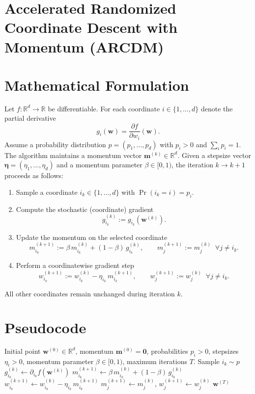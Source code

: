 \documentclass{article}
\newcommand{\R}{\mathbb{R}}
\begin{document}
\section*{Accelerated Randomized Coordinate Descent with Momentum (ARCDM)}

\section*{Mathematical Formulation}
Let $f:\R^{d}\rightarrow\R$ be differentiable.  
For each coordinate $i\in\{1,\dots ,d\}$ denote the partial derivative
\[
g_i(\mathbf w)=\frac{\partial f}{\partial w_i}(\mathbf w).
\]
Assume a probability distribution $p=(p_1,\dots ,p_d)$ with $p_i>0$ and $\sum_i p_i=1$.
The algorithm maintains a momentum vector $\mathbf m^{(k)}\in\R^{d}$.
Given a stepsize vector $\boldsymbol\eta=(\eta_1,\dots ,\eta_d)$ and a momentum
parameter $\beta\in[0,1)$, the iteration $k\!\to\!k+1$ proceeds as follows:

\begin{enumerate}
    \item Sample a coordinate $i_k\in\{1,\dots ,d\}$ with $\Pr(i_k=i)=p_i$.
    \item Compute the stochastic (coordinate) gradient
    \[
        g_{i_k}^{(k)}:=g_{i_k}(\mathbf w^{(k)}).
    \]
    \item Update the momentum on the selected coordinate
    \[
        m_{i_k}^{(k+1)}:=\beta\,m_{i_k}^{(k)}+(1-\beta)\,g_{i_k}^{(k)},
        \qquad
        m_{j}^{(k+1)}:=m_{j}^{(k)}\;\; \forall j\neq i_k .
    \]
    \item Perform a coordinatewise gradient step
    \[
        w_{i_k}^{(k+1)}:=w_{i_k}^{(k)}-\eta_{i_k}\,m_{i_k}^{(k+1)},
        \qquad
        w_{j}^{(k+1)}:=w_{j}^{(k)}\;\; \forall j\neq i_k .
    \]
\end{enumerate}

All other coordinates remain unchanged during iteration $k$.

\section*{Pseudocode}
\begin{algorithm}[H]
\caption{Accelerated Randomized Coordinate Descent with Momentum}
\begin{algorithmic}[1]
\Require Initial point $\mathbf w^{(0)}\in\R^{d}$, momentum $\mathbf m^{(0)}=\mathbf 0$,
probabilities $p_i>0$, stepsizes $\eta_i>0$, momentum parameter $\beta\in[0,1)$, 
maximum iterations $T$.
    \State Sample $i_k\sim p$   
    \State $g_{i_k}^{(k)}\gets \partial_{i_k}f(\mathbf w^{(k)})$
    \State $m_{i_k}^{(k+1)}\gets \beta\,m_{i_k}^{(k)}+(1-\beta)\,g_{i_k}^{(k)}$
    \State $w_{i_k}^{(k+1)}\gets w_{i_k}^{(k)}-\eta_{i_k}\,m_{i_k}^{(k+1)}$
        \State $m_{j}^{(k+1)}\gets m_{j}^{(k)}$, \; $w_{j}^{(k+1)}\gets w_{j}^{(k)}$
    \EndFor
\EndFor
\State \Return $\mathbf w^{(T)}$
\end{algorithmic}
\end{algorithm}
\end{document}
